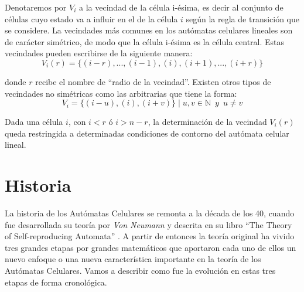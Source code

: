 Denotaremos por $V_i$ a la vecindad de la célula i-ésima, es decir al conjunto de células cuyo estado va a influir en el de la célula $i$ según la regla de transición que se considere. La vecindades más comunes en los autómatas celulares lineales son de carácter simétrico, de modo que la célula i-ésima es la célula central. Estas vecindades pueden escribirse de la siguiente manera:
$$V_i (r) = \lbrace (i-r), ... ,(i-1),(i),(i+1), ... ,(i+r)\rbrace$$

donde $r$ recibe el nombre de ``radio de la vecindad''. Existen otros tipos de vecindades no simétricas como las arbitrarias que tiene la forma:
$$V_i = \lbrace (i-u), (i), (i+v) \rbrace \mid u,v \in \mathbb{N} \enspace y \enspace u \ne v$$

Dada una célula $i$, con $i < r$ ó $i > n-r $, la determinación de la vecindad $V_i(r)$ queda restringida a determinadas condiciones de contorno del autómata celular lineal.

\section{Historia}
La historia de los Autómatas Celulares se remonta a la década de los 40, cuando fue desarrollada su teoría por \textit{Von Neumann} y descrita en su libro ``The Theory of Self-reproducing Automata'' \cite{Teoria_Von_neumann}.
A partir de entonces la teoría original ha vivido tres grandes etapas por grandes matemáticos que aportaron cada uno de ellos un nuevo enfoque o una nueva característica importante en la teoría de los Autómatas Celulares.
Vamos a describir como fue la evolución en estas tres etapas de forma cronológica. 


